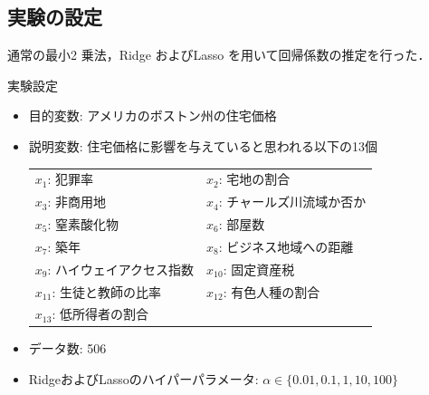\documentclass[dvipdfmx, 10pt]{beamer}
\begin{document}
\subsection{実験の設定}
\begin{frame}{\insertsubsection}
    通常の最小2 乗法，Ridge およびLasso を用いて回帰係数の推定を行った．\\
    \begin{block}{実験設定}
        \begin{itemize}
                \item 目的変数: アメリカのボストン州の住宅価格
                \item 説明変数: 住宅価格に影響を与えていると思われる以下の13個
                    \begin{table}[htb]
                    	\begin{tabular}{ll}
                    	$x_1$: 犯罪率  & $x_2$: 宅地の割合\\
                    	$x_3$: 非商用地 &  $x_4$: チャールズ川流域か否か\\
                    	$x_5$: 窒素酸化物 &  $x_6$: 部屋数\\
                    	$x_7$: 築年 &  $x_8$: ビジネス地域への距離\\
                    	$x_9$: ハイウェイアクセス指数 &  $x_{10}$: 固定資産税\\
                    	$x_{11}$: 生徒と教師の比率 &  $x_{12}$: 有色人種の割合\\
                    	$x_{13}$: 低所得者の割合\\
                    	\end{tabular}
                    \end{table}
                \item データ数: 506
                \item RidgeおよびLassoのハイパーパラメータ: $\alpha \in \{0.01, 0.1, 1, 10, 100\}$
        \end{itemize}
    \end{block}
\end{frame}
\end{document}
